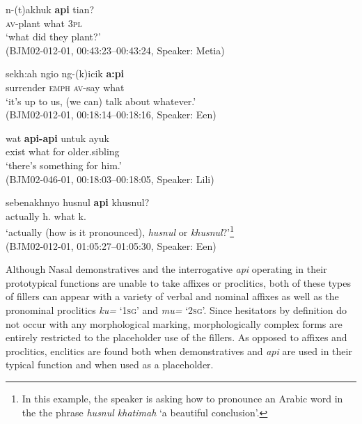 \documentclass[output=paper,colorlinks,citecolor=brown
\ChapterDOI{10.5281/zenodo.15697585}
]{langscibook}
\begin{document}
\begin{exe}
    \ex\label{ex:api-intro-inter} \gll
        n-(t)akhuk \textbf{api} tian? \\
        \textsc{av}-plant what 3\textsc{pl} \\
        \glt `what did they plant?' \\
    \hfill (BJM02-012-01, 00:43:23–00:43:24, Speaker: Metia) 

    \ex\label{ex:api-intro-indef} \gll
        sekh:ah ngio ng-(k)icik \textbf{a:pi} \\
        surrender \textsc{emph} \textsc{av}-say what \\
        \glt `it's up to us, (we can) talk about whatever.' \\
    \hfill (BJM02-012-01, 00:18:14–00:18:16, Speaker: Een) 
\end{exe}

\begin{exe}
    \ex\label{ex:api-intro-indef2} \gll
        wat \textbf{api-api} untuk ayuk \\
        exist what for older.sibling \\
        \glt `there's something for him.' \\
    \hfill (BJM02-046-01, 00:18:03–00:18:05, Speaker: Lili)
\end{exe}

\begin{exe}
    \ex\label{ex:api-intro-conj} \gll
        sebenakhnyo husnul \textbf{api} khusnul? \\
        actually h. what k. \\
        \glt `actually (how is it pronounced), \textit{husnul} or \textit{khusnul}?'\footnote{In this example, the speaker is asking how to pronounce an Arabic word in the the phrase \textit{husnul khatimah} `a beautiful conclusion'.}\\
    \hfill (BJM02-012-01, 01:05:27–01:05:30, Speaker: Een) 
\end{exe}


Although Nasal demonstratives and the interrogative \textit{api} operating in their prototypical functions are unable to take affixes or proclitics, both of these types of fillers can appear with a variety of verbal and nominal affixes as well as the pronominal proclitics \textit{ku=} `1\textsc{sg}' and \textit{mu=} `2\textsc{sg}'. Since hesitators by definition do not occur with any  morphological marking, morphologically complex forms are entirely restricted to the placeholder use of the fillers. As opposed to affixes and proclitics, enclitics are found both when demonstratives and \textit{api} are used in their typical function and when used as a placeholder.
\end{document}
